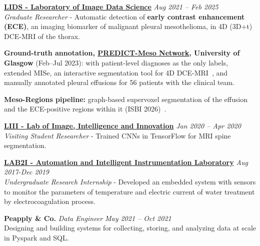 \documentclass[margin,line]{resume}
\begin{document}
\begin{resume}
       \textbf{\href{https://lids.ic.unicamp.br/people}{LIDS - Laboratory of Image Data Science}} \hfill \textsl{Aug 2021 -- Feb 2025}  \\
       \textit{Graduate Researcher} - Automatic detection of \textbf{early contrast enhancement (ECE)}, an imaging biomarker of malignant pleural mesothelioma, in 4D (3D+t) DCE-MRI of the thorax.
       \begin{list2}
        \item \textbf{Ground-truth annotation, \href{https://www.predictmeso.com/members/}{PREDICT-Meso Network}, University of Glasgow} (Feb--Jul 2023): with patient-level diagnoses as the only labels, extended MISe, an interactive segmentation tool for 4D DCE-MRI~\cite{mise2023}, and manually annotated pleural effusions for 56 patients with the clinical team.
        \item \textbf{Meso-Regions pipeline:} graph-based supervoxel segmentation of the effusion and the ECE-positive regions within it (ISBI 2026)~\cite{11515662, theodoro2025mesothelioma,9643120,ARMATO2024107832}.
       \end{list2}
        \vspace{-0.3cm}

        \textbf{\href{https://sites.google.com/view/labiii/members/current?authuser=0}{LIII - Lab of Image, Intelligence and Innovation}} \hfill \textsl{Jan 2020 -- Apr 2020}\\
         \textit{Visiting Student Researcher} - Trained CNNs in TensorFlow for MRI spine segmentation.
        \vspace{-0.3cm}
        
        \textbf{\href{https://www.linkedin.com/company/la2i---laborat-rio-de-automa-o-e-instrumenta-o-inteligente/}{LAB2I - Automation and Intelligent Instrumentation Laboratory}}  \hfill \textsl{Aug 2017-Dec 2019}\\
         \textit{Undergraduate Research Internship} - Developed an embedded system with sensors to monitor the parameters of temperature and electric current of water treatment by electrocoagulation process.
         
        \vspace{-0.3cm}
        
        \textbf{Peapply \& Co.} \textit{Data Engineer}  \hfill \textsl{May 2021 -- Oct 2021}\\
         Designing and building systems for collecting, storing, and analyzing data at scale in Pyspark and SQL.
    \vspace{-0.2cm}

\end{resume}
\end{document}
